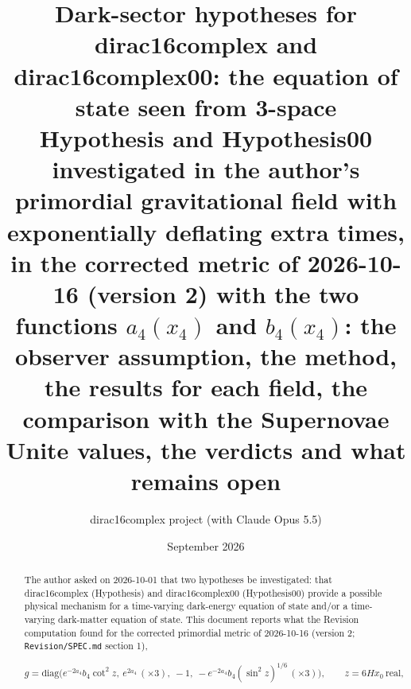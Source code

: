 \documentclass[11pt]{article}
\title{Dark-sector hypotheses for dirac16complex and dirac16complex00: the equation of state seen from 3-space\\[0.5em]\large Hypothesis and Hypothesis00 investigated in the author's primordial gravitational field with exponentially deflating extra times, in the corrected metric of 2026-10-16 (version 2) with the two functions $a_4(x_4)$ and $b_4(x_4)$: the observer assumption, the method, the results for each field, the comparison with the Supernovae Unite values, the verdicts and what remains open}
\author{dirac16complex project (with Claude Opus 5.5)}
\date{September 2026}
\begin{document}
\maketitle
\tableofcontents
\newpage
\begin{abstract}
The author asked on 2026-10-01 that two hypotheses be investigated: that dirac16complex (Hypothesis) and dirac16complex00 (Hypothesis00) provide a possible physical mechanism for a time-varying dark-energy equation of state and/or a time-varying dark-matter equation of state. This document reports what the Revision computation found for the corrected primordial metric of 2026-10-16 (version 2; \texttt{Revision\allowbreak{}/SPEC.md} section 1),

\[
g = \mathrm{diag}\big(e^{-2a_4}b_4\cot^2 z,\ e^{2a_4}\,(\times3),\ -1,\ -e^{-2a_4}b_4(\sin^2 z)^{1/6}\,(\times3)\big),\qquad z = 6Hx_0\ \text{real},
\]


\end{abstract}
\end{document}
